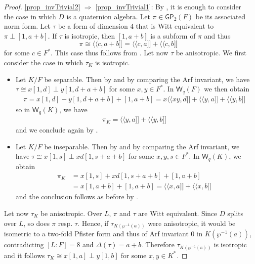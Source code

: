 \documentclass{amsart}
\numberwithin{equation}{section}
\newcommand{\qpf}[1]{\langle\!\langle #1]\!]}
\newcommand{\W}{\mathsf{W}}
\newcommand{\GP}{\mathsf{GP}}
\begin{document}
\begin{proof}
    \ref{prop_invTrivial2} $\Rightarrow$ \ref{prop_invTrivial1}:
        By , it is enough to consider the case in which $D$ is a quaternion algebra. Let $\pi \in \GP_2(F)$ be its associated norm form.
        Let $\tau$ be a form of dimension 4 that is Witt equivalent to $\pi \perp [1, a + b]$.
        If $\tau$ is isotropic, then $[1, a+b]$ is a subform of $\pi$ and thus
        \[\pi \cong \qpf{c, a + b} = \qpf{c, a} + \qpf{c, b} \]
        for some $c \in F^\ast$.
        This case thus follows from .
        Let now $\tau$ be anisotropic. 
        We first consider the case in which $\tau_K$ is isotropic.
        \begin{itemize}
            \item Let $K / F$ be separable.
            Then by \cite[Chapter V, (4.2) Theorem]{Baeza_SemilocalRings} and by comparing the Arf invariant, we have $\tau \cong x[1, d] \perp y[1, d + a + b]$ for some $x, y \in F^\ast$.
            In $\W_q(F)$ we then obtain 
            \begin{align*}
                \pi = x[1, d] + y[1, d + a + b] + [1, a+b] = x\qpf{xy, d} + \qpf{y, a} + \qpf{y, b}
            \end{align*}
            so in $\W_q(K)$, we have
            \begin{align*}
                \pi_K = \qpf{y, a} + \qpf{y, b}
            \end{align*}
            and we conclude again by .
            \item Let $K / F$ be inseparable.
            Then by \cite[Corollary 2.4]{Ahmad94} and by comparing the Arf invariant, we have $\tau \cong x[1, s] \perp xd[1, s + a + b]$ for some $x, y, s \in F^\ast$.
            In $\W_q(K)$, we obtain
            \begin{align*}
                \pi_K &= x[1, s] + xd[1, s + a + b] + [1, a+b] \\
                &=x[1, a + b] + [1, a+b] = \qpf{x, a} + \qpf{x, b}
            \end{align*}
            and the conclusion follows as before by .
        \end{itemize}
        Let now $\tau_K$ be anisotropic.
        Over $L$, $\pi$ and $\tau$ are Witt equivalent.
        Since $D$ splits over $L$, so does $\pi$ resp. $\tau$.
        Hence, if $\tau_{K(\wp^{-1}(a))}$ were anisotropic, it would be isometric to a two-fold Pfister form and thus of Arf invariant 0 in $K(\wp^{-1}(a))$, contradicting $[L : F] = 8$ and $\Delta(\tau) = a + b$.
        Therefore $\tau_{K(\wp^{-1}(a))}$ is isotropic and it follows $\tau_K \cong x[1, a] \perp y [1, b]$ for some $x, y \in K^\ast$.
        

\end{proof}
\end{document}
